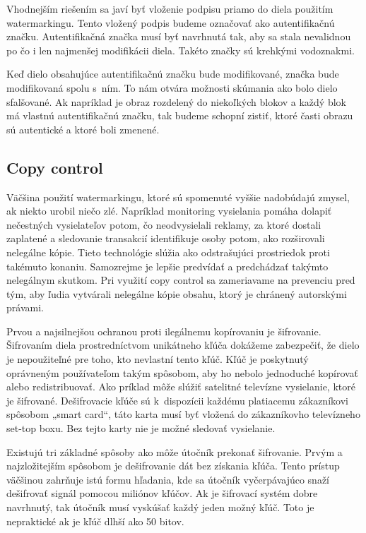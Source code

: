 Vhodnejším riešením sa javí byť vloženie podpisu priamo do diela použitím watermarkingu. Tento vložený podpis budeme označovať ako autentifikačnú značku. Autentifikačná značka musí byť navrhnutá tak, aby sa stala nevalidnou po čo i len najmenšej modifikácii diela. Takéto značky sú krehkými vodoznakmi.

Keď dielo obsahujúce autentifikačnú značku bude modifikované, značka bude modifikovaná spolu s~ním. To nám otvára možnosti skúmania ako bolo dielo sfalšované. Ak napríklad je obraz rozdelený do niekoľkých blokov a každý blok má vlastnú autentifikačnú značku, tak budeme schopní zistiť, ktoré časti obrazu sú autentické a ktoré boli zmenené. \cite{Cox}

\subsection{Copy control}
Väčšina použití watermarkingu, ktoré sú spomenuté vyššie nadobúdajú zmysel, ak niekto urobil niečo zlé. Napríklad monitoring vysielania pomáha dolapiť nečestných vysielateľov potom, čo neodvysielali reklamy, za ktoré dostali zaplatené a sledovanie transakcií identifikuje osoby potom, ako rozširovali nelegálne kópie. Tieto technológie slúžia ako odstrašujúci prostriedok proti takémuto konaniu. Samozrejme je lepšie predvídať a predchádzať takýmto nelegálnym skutkom. Pri využití copy control sa zameriavame na prevenciu pred tým, aby ľudia vytvárali nelegálne kópie obsahu, ktorý je chránený autorskými právami.

Prvou a najsilnejšou ochranou proti ilegálnemu kopírovaniu je šifrovanie. Šifrovaním diela prostredníctvom unikátneho kľúča dokážeme zabezpečiť, že dielo je nepoužiteľné pre toho, kto nevlastní tento kľúč. Kľúč je poskytnutý oprávneným používateľom takým spôsobom, aby ho nebolo jednoduché kopírovať alebo redistribuovať. Ako príklad môže slúžiť satelitné televízne vysielanie, ktoré je šifrované. Dešifrovacie kľúče sú k~dispozícii každému platiacemu zákazníkovi spôsobom „smart card“, táto karta musí byť vložená do zákazníkovho televízneho set-top boxu. Bez tejto karty nie je možné sledovať vysielanie.

Existujú tri základné spôsoby ako môže útočník prekonať šifrovanie. Prvým a najzložitejším spôsobom je dešifrovanie dát bez získania kľúča. Tento prístup väčšinou zahrňuje istú formu hľadania, kde sa útočník vyčerpávajúco snaží dešifrovať signál pomocou miliónov kľúčov. Ak je šifrovací systém dobre navrhnutý, tak útočník musí vyskúšať každý jeden možný kľúč. Toto je nepraktické ak je kľúč dlhší ako 50 bitov.

